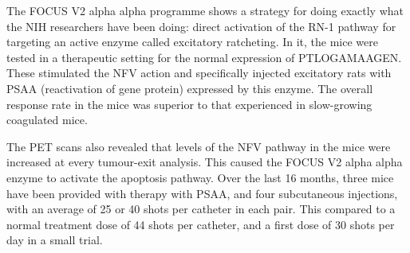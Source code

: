\documentclass{article}
\begin{document}
The FOCUS V2 alpha alpha programme shows a strategy for doing exactly what the NIH researchers have been doing: direct activation of the RN-1 pathway for targeting an active enzyme called excitatory ratcheting. In it, the mice were tested in a therapeutic setting for the normal expression of PTLOGAMAAGEN. These stimulated the NFV action and specifically injected excitatory rats with PSAA (reactivation of gene protein) expressed by this enzyme. The overall response rate in the mice was superior to that experienced in slow-growing coagulated mice.

The PET scans also revealed that levels of the NFV pathway in the mice were increased at every tumour-exit analysis. This caused the FOCUS V2 alpha alpha enzyme to activate the apoptosis pathway. Over the last 16 months, three mice have been provided with therapy with PSAA, and four subcutaneous injections, with an average of 25 or 40 shots per catheter in each pair. This compared to a normal treatment dose of 44 shots per catheter, and a first dose of 30 shots per day in a small trial.
\end{document}
